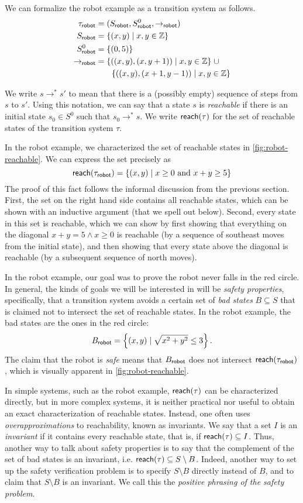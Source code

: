 We can formalize the robot example as a transition system as follows.
\begin{align*}
  \tau_\robot &= (S_\robot, S^0_\robot, \to_\robot)\\
  S_\robot &= \set{(x,y) \mid x,y\in\Z}\\
  S^0_\robot &= \set{(0, 5)}\\
  \to_\robot &= \set{((x,y), (x, y + 1)) \mid x,y\in\Z} \mathrel{\cup}\\
            &\phantom{\mathrel{=}}\quad \set{((x,y), (x + 1, y - 1)) \mid x,y\in\Z}
\end{align*}

We write $s\to^* s'$ to mean that there is a (possibly empty) sequence of steps from $s$ to $s'$.
Using this notation, we can say that a state $s$ is \emph{reachable}
  if there is an initial state $s_0\in S^0$ such that $s_0 \to^* s$.
We write $\mathsf{reach}(\tau)$ for the set of reachable states of the transition system $\tau$.

In the robot example,
  we characterized the set of reachable states in \cref{fig:robot-reachable}.
We can express the set precisely as
\[
  \mathsf{reach}(\tau_{\mathsf{robot}}) = \left\{{(x,y) \mid x \ge 0 \text{ and } x + y \ge 5}\right\}
\]
The proof of this fact follows the informal discussion from the previous section.
First, the set on the right hand side contains all reachable states,
  which can be shown with an inductive argument (that we spell out below).
Second, every state in this set is reachable,
  which we can show by
  first showing that everything on the diagonal $x + y = 5 \land x \ge 0$ is reachable
    (by a sequence of southeast moves from the initial state),
  and then showing that every state above the diagonal is reachable
    (by a subsequent sequence of north moves).

In the robot example, our goal was to prove the robot never falls in the red circle.
In general, the kinds of goals we will be interested in will be \emph{safety properties},
  specifically, that a transition system avoids a certain set of \emph{bad states} $B\subseteq S$
  that is claimed not to intersect the set of reachable states.
In the robot example, the bad states are the ones in the red circle:
\[
  B_{\mathsf{robot}} = \left\{{(x,y) \mid \sqrt{x^2 + y^2} \le 3}\right\}.
\]
The claim that the robot is \emph{safe} means that $B_{\mathsf{robot}}$ does not intersect $\mathsf{reach}(\tau_{\mathsf{robot}})$,
  which is visually apparent in \cref{fig:robot-reachable}.

In simple systems, such as the robot example,
  $\mathsf{reach}(\tau)$ can be characterized directly,
  but in more complex systems, it is neither practical nor useful
  to obtain an exact characterization of reachable states.
Instead, one often uses \emph{overapproximations} to reachability,
  known as invariants.
We say that a set $I$ is an \emph{invariant} if it contains every reachable state,
  that is, if $\mathsf{reach}(\tau) \subseteq I$.
Thus, another way to talk about safety properties is to say that
  the complement of the set of bad states is an invariant,
  i.e. $\mathsf{reach}(\tau) \subseteq S\setminus B$.
Indeed, another way to set up the safety verification problem is
  to specify $S\setminus B$ directly instead of $B$,
  and to claim that $S\setminus B$ is an invariant.
We call this the \emph{positive phrasing of the safety problem}.

